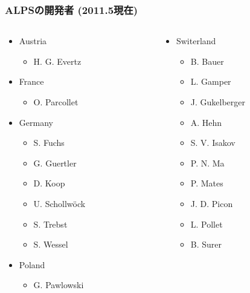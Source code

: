 \begin{frame}
  \frametitle{ALPSの開発者 (2011.5現在)}
  \begin{columns}[T]
    \begin{column}{.34\textwidth}
      \begin{itemize}
      \item Austria
        \begin{itemize}
        \item H. G. Evertz
        \end{itemize}
      \item France
        \begin{itemize}
        \item O. Parcollet
        \end{itemize}
      \item Germany
        \begin{itemize}
        \item S. Fuchs
        \item G. Guertler
        \item D. Koop
        \item U. Schollw\"ock
        \item S. Trebst
        \item S. Wessel
        \end{itemize}
      \item Poland
        \begin{itemize}
        \item G. Pawlowski
        \end{itemize}
      \end{itemize}
    \end{column}
    \begin{column}{.34\textwidth}
      \begin{itemize}
      \item Switerland
        \begin{itemize}
        \item B. Bauer
        \item L. Gamper
        \item J. Gukelberger
        \item A. Hehn
        \item S. V. Isakov
        \item P. N. Ma
        \item P. Mates
        \item J. D. Picon
        \item L. Pollet
        \item B. Surer

\end{itemize}
\end{itemize}
\end{column}
\end{columns}
\end{frame}
